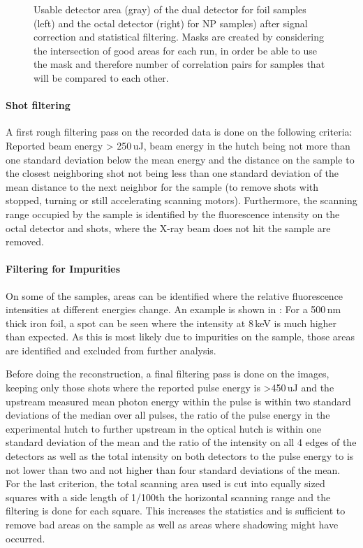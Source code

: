 \begin{figure}
\begin{subfigure}{0.2\textwidth}
	\end{subfigure}
	\caption[Usable detector area]{Usable detector area (gray) of the dual detector for foil samples (left) and the octal detector (right) for NP samples) after signal correction and statistical filtering. Masks are created by considering the intersection of good areas for each run, in order be able to use the mask and therefore number of correlation pairs for samples that will be compared to each other.}	
\end{figure}

\paragraph{Shot filtering}
A first rough filtering pass on the recorded data is done on the following criteria: Reported beam energy > 250\,uJ, beam energy in the hutch being not more than one standard deviation below the mean energy and the distance on the sample to the closest neighboring shot not being less than one standard deviation of the mean distance to the next neighbor for the sample (to remove shots with stopped, turning or still accelerating scanning motors). Furthermore, the scanning range occupied by the sample is identified by the fluorescence intensity on the octal detector and shots, where the X-ray beam does not hit the sample are removed.

 
\paragraph{Filtering for Impurities}
On some of the samples, areas can be identified where the relative fluorescence intensities at different energies change. An example is shown in : For a 500\,nm thick iron foil, a spot can be seen where the intensity at 8\,keV is much higher than expected. As this is most likely due to impurities on the sample, those areas are identified and excluded from further analysis.

Before doing the reconstruction, a final filtering pass is done on the images, keeping only those shots where the reported pulse energy is >450\,uJ and the upstream measured mean photon energy within the pulse is within two standard deviations of the median over all pulses, the ratio of the pulse energy in the experimental hutch to further upstream in the optical hutch is within one standard deviation of the mean and the ratio of the intensity on all 4 edges of the detectors as well as  the total intensity on both detectors to the pulse energy to is not lower than two and not higher than four standard deviations of the mean.  For the last criterion, the total scanning area used is cut into equally sized squares with a side length of 1/100th the horizontal scanning range and the filtering is done for each square. This increases the statistics and is sufficient to remove bad areas on the sample as well as areas where shadowing might have occurred.

